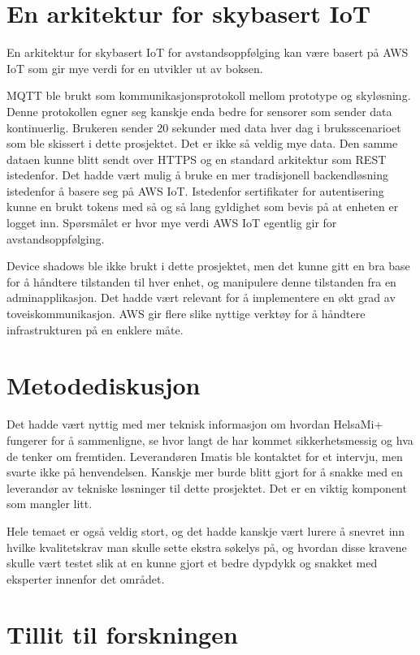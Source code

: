 \section{En arkitektur for skybasert IoT}
En arkitektur for skybasert IoT for avstandsoppfølging kan være basert på AWS IoT som gir mye verdi for en utvikler ut av boksen.

MQTT ble brukt som kommunikasjonsprotokoll mellom prototype og skyløsning. Denne protokollen egner seg kanskje enda bedre for sensorer
som sender data kontinuerlig. Brukeren sender 20 sekunder med data hver dag i bruksscenarioet som ble skissert i dette prosjektet. Det er ikke så veldig
mye data. Den samme dataen kunne blitt sendt over HTTPS og en standard arkitektur som REST istedenfor. Det hadde vært mulig å bruke
en mer tradisjonell backendløsning istedenfor å basere seg på AWS IoT. Istedenfor sertifikater for autentisering
kunne en brukt tokens med så og så lang gyldighet som bevis på at enheten er logget inn. Spørsmålet er hvor mye verdi AWS IoT egentlig gir
for avstandsoppfølging.

Device shadows ble ikke brukt i dette prosjektet, men det kunne gitt en bra base for å håndtere tilstanden til hver enhet, og manipulere denne tilstanden
fra en adminapplikasjon. Det hadde vært relevant for å implementere en økt grad av toveiskommunikasjon. AWS gir flere slike nyttige verktøy for
å håndtere infrastrukturen på en enklere måte.

\section{Metodediskusjon}
Det hadde vært nyttig med mer teknisk informasjon om hvordan HelsaMi+ fungerer for å sammenligne,
se hvor langt de har kommet sikkerhetsmessig og hva de tenker om fremtiden. Leverandøren Imatis ble kontaktet for et
intervju, men svarte ikke på henvendelsen. Kanskje mer burde blitt gjort for å snakke med en leverandør av tekniske løsninger
til dette prosjektet. Det er en viktig komponent som mangler litt.

Hele temaet er også veldig stort, og det hadde kanskje vært
lurere å snevret inn hvilke kvalitetskrav man skulle sette ekstra søkelys på, og hvordan disse kravene
skulle vært testet slik at en kunne gjort et bedre dypdykk
og snakket med eksperter innenfor det området.

\section{Tillit til forskningen} %
\label{sec:validitet}

